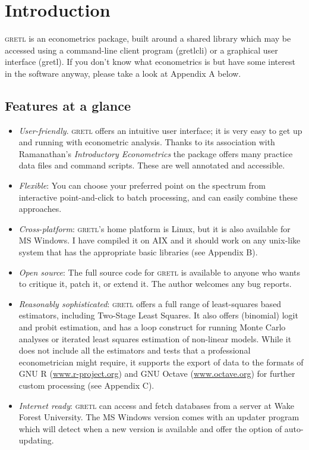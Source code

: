 \documentclass{article}
\begin{document}
\clearpage

\section{Introduction}
\label{intro}

\textsc{gretl} is an econometrics package, built around a shared
library which may be accessed using a command-line client program
(\textsf{gretlcli}) or a graphical user interface (\textsf{gretl}).
If you don't know what econometrics is but have some interest in the
software anyway, please take a look at Appendix A below.

\subsection{Features at a glance}

\begin{itemize}
\item \textit{User-friendly}.  \textsc{gretl} offers an intuitive user
  interface; it is very easy to get up and running with econometric
  analysis.  Thanks to its association with Ramanathan's
  \textit{Introductory Econometrics} the package offers many practice
  data files and command scripts.  These are well annotated and
  accessible.  
\item \textit{Flexible}: You can choose your preferred point on the
  spectrum from interactive point-and-click to batch processing, and
  can easily combine these approaches.
\item \textit{Cross-platform}: \textsc{gretl}'s home platform is
  Linux, but it is also available for MS Windows.  I have compiled it
  on AIX and it should work on any unix-like system that has the
  appropriate basic libraries (see Appendix B).  
\item \textit{Open source}: The full source code for \textsc{gretl} is
  available to anyone who wants to critique it, patch it, or extend
  it.  The author welcomes any bug reports.
\item \textit{Reasonably sophisticated}: \textsc{gretl} offers a full
  range of least-squares based estimators, including Two-Stage Least
  Squares.  It also offers (binomial) logit and probit estimation, and
  has a loop construct for running Monte Carlo analyses or iterated
  least squares estimation of non-linear models.  While it does not
  include all the estimators and tests that a professional
  econometrician might require, it supports the export of data to the
  formats of GNU R (\url{www.r-project.org}) and GNU Octave
  (\url{www.octave.org}) for further custom processing (see Appendix
  C).
\item \textit{Internet ready}: \textsc{gretl} can access and fetch
  databases from a server at Wake Forest University.  The MS Windows
  version comes with an updater program which will detect when a new
  version is available and offer the option of auto-updating.
\end{itemize}
\end{document}
